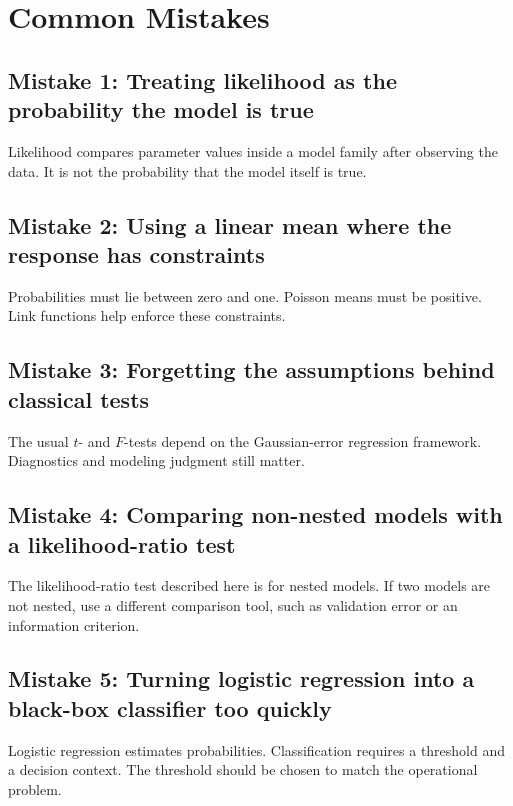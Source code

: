 \section{Common Mistakes}

\subsection*{Mistake 1: Treating likelihood as the probability the model is true}

Likelihood compares parameter values inside a model family after observing the data.  It is not the probability that the model itself is true.

\subsection*{Mistake 2: Using a linear mean where the response has constraints}

Probabilities must lie between zero and one.  Poisson means must be positive.  Link functions help enforce these constraints.

\subsection*{Mistake 3: Forgetting the assumptions behind classical tests}

The usual \(t\)- and \(F\)-tests depend on the Gaussian-error regression framework.  Diagnostics and modeling judgment still matter.

\subsection*{Mistake 4: Comparing non-nested models with a likelihood-ratio test}

The likelihood-ratio test described here is for nested models.  If two models are not nested, use a different comparison tool, such as validation error or an information criterion.

\subsection*{Mistake 5: Turning logistic regression into a black-box classifier too quickly}

Logistic regression estimates probabilities.  Classification requires a threshold and a decision context.  The threshold should be chosen to match the operational problem.

